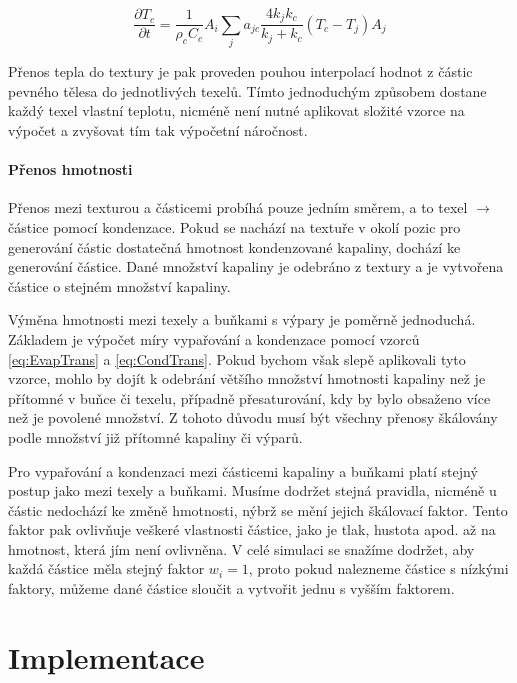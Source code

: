 \begin{equation}
    \frac{\partial T_c}{\partial t} = \frac{1}{\rho_c C_c} A_i \sum_j a_{jc}\frac{4 k_j k_c}{k_j + k_c}(T_c - T_j)A_j
    \label{eq:Cell2Part}
\end{equation}

Přenos tepla do textury je pak proveden pouhou interpolací hodnot z částic pevného tělesa do jednotlivých texelů. Tímto jednoduchým způsobem dostane každý texel vlastní teplotu, nicméně není nutné aplikovat složité vzorce na výpočet a zvyšovat tím tak výpočetní náročnost.

\subsubsection{Přenos hmotnosti}
Přenos mezi texturou a částicemi probíhá pouze jedním směrem, a to texel $\rightarrow$ částice pomocí kondenzace. Pokud se nachází na textuře v okolí pozic pro generování částic dostatečná hmotnost kondenzované kapaliny, dochází ke generování částice. Dané množství kapaliny je odebráno z textury a je vytvořena částice o stejném množství kapaliny.

Výměna hmotnosti mezi texely a buňkami s výpary je poměrně jednoduchá. Základem je výpočet míry vypařování a kondenzace pomocí vzorců \ref{eq:EvapTrans} a \ref{eq:CondTrans}. Pokud bychom však slepě aplikovali tyto vzorce, mohlo by dojít k odebrání většího množství hmotnosti kapaliny než je přítomné v buňce či texelu, případně přesaturování, kdy by bylo obsaženo více než je povolené množství. Z tohoto důvodu musí být všechny přenosy škálovány podle množství již přítomné kapaliny či výparů.

Pro vypařování a kondenzaci mezi částicemi kapaliny a buňkami platí stejný postup jako mezi texely a buňkami. Musíme dodržet stejná pravidla, nicméně u částic nedochází ke změně hmotnosti, nýbrž se mění jejich škálovací faktor. Tento faktor pak ovlivňuje veškeré vlastnosti částice, jako je tlak, hustota apod. až na hmotnost, která jím není ovlivněna. V celé simulaci se snažíme dodržet, aby každá částice měla stejný faktor $w_i = 1$, proto pokud nalezneme částice s nízkými faktory, můžeme dané částice sloučit a vytvořit jednu s vyšším faktorem. 




\chapter{Implementace}
\label{chapter:implementace}
